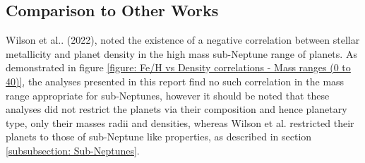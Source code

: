 \documentclass[a4paper,twocolumn,12pt]{article}
\begin{document}











\subsection{Comparison to Other Works}
Wilson et al.. (2022), noted the existence of a negative correlation between stellar metallicity and planet density in the high mass sub-Neptune range of planets. As demonstrated in figure \ref{figure: Fe/H vs Density correlations - Mass ranges (0 to 40)}, the analyses presented in this report find no such correlation in the mass range appropriate for sub-Neptunes, however it should be noted that these analyses did not restrict the planets via their composition and hence planetary type, only their masses radii and densities, whereas Wilson et al. restricted their planets to those of sub-Neptune like properties, as described in section \ref{subsubsection: Sub-Neptunes}.
\end{document}
